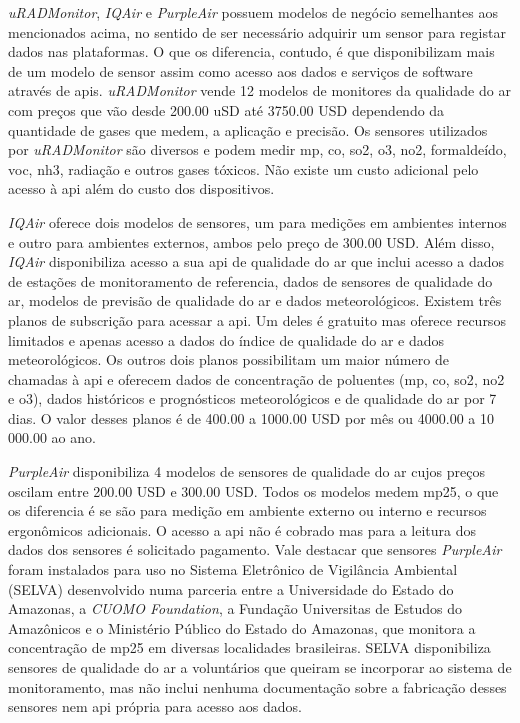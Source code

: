\textit{uRADMonitor}, \textit{IQAir} e \textit{PurpleAir} possuem modelos de negócio semelhantes aos mencionados acima, no sentido de ser necessário adquirir um sensor para registar dados nas plataformas. O que os diferencia, contudo, é que disponibilizam mais de um modelo de sensor assim como acesso aos dados e serviços de software através de \acrshort{api}s. \textit{uRADMonitor} vende 12 modelos de monitores da qualidade do ar com preços que vão desde 200.00 uSD até 3750.00 USD dependendo da quantidade de gases que medem, a aplicação e precisão. Os sensores utilizados por \textit{uRADMonitor} são diversos e podem medir \acrshort{mp}, \acrshort{co}, \acrshort{so2}, \acrshort{o3}, \acrshort{no2}, formaldeído, \acrshort{voc}, \acrshort{nh3}, radiação e outros gases tóxicos. Não existe um custo adicional pelo acesso à \acrshort{api} além do custo dos dispositivos. 

\textit{IQAir} oferece dois modelos de sensores, um para medições em ambientes internos e outro para ambientes externos, ambos pelo preço de 300.00 USD. Além disso, \textit{IQAir} disponibiliza acesso a sua \acrshort{api} de qualidade do ar que inclui acesso a dados de estações de monitoramento de referencia, dados de sensores de qualidade do ar, modelos de previsão de qualidade do ar e dados meteorológicos. Existem três planos de subscrição para acessar a \acrshort{api}. Um deles é gratuito mas oferece recursos limitados e apenas acesso a dados do índice de qualidade do ar e dados meteorológicos. Os outros dois planos possibilitam um maior número de chamadas à \acrshort{api} e oferecem dados de concentração de poluentes (\acrshort{mp}, \acrshort{co}, \acrshort{so2}, \acrshort{no2} e \acrshort{o3}), dados históricos e prognósticos meteorológicos e de qualidade do ar por 7 dias. O valor desses planos é de 400.00 a 1000.00 USD por mês ou 4000.00 a 10 000.00 ao ano.

\textit{PurpleAir} disponibiliza 4 modelos de sensores de qualidade do ar cujos preços oscilam entre 200.00 USD e 300.00 USD. Todos os modelos medem \acrshort{mp25}, o que os diferencia é se são para medição em ambiente externo ou interno e recursos ergonômicos adicionais. O acesso a \acrshort{api} não é cobrado mas para a leitura dos dados dos sensores é solicitado pagamento. Vale destacar que sensores \textit{PurpleAir} foram instalados para uso no Sistema Eletrônico de Vigilância Ambiental (SELVA) \cite{Ribeiro2021} desenvolvido numa parceria entre a Universidade do Estado do Amazonas, a \textit{CUOMO Foundation}, a Fundação Universitas de Estudos do Amazônicos e o Ministério Público do Estado do Amazonas, que monitora a concentração de \acrshort{mp25} em diversas localidades brasileiras. SELVA disponibiliza sensores de qualidade do ar a voluntários que queiram se incorporar ao sistema de monitoramento, mas não inclui nenhuma documentação sobre a fabricação desses sensores nem \acrshort{api} própria para acesso aos dados.

